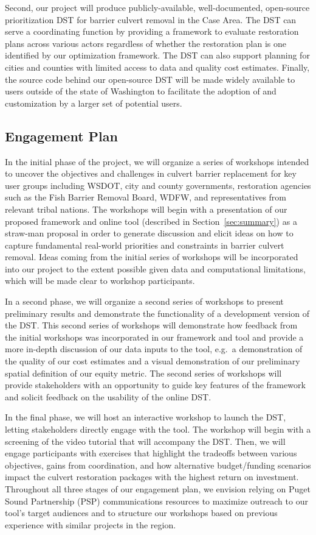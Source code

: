 \documentclass[12pt]{elsarticle}
\begin{document}
	
	Second, our project will produce publicly-available, well-documented, open-source prioritization DST for barrier culvert removal in the Case Area. The DST can serve a coordinating function by providing a framework to evaluate restoration plans across various actors regardless of whether the restoration plan is one identified by our optimization framework. The DST can also support planning for cities and counties with limited access to data and quality cost estimates. Finally, the source code behind our open-source DST will be made widely available to users outside of the state of Washington to facilitate the adoption of and customization by a larger set of potential users. 
	
	\subsection{Engagement Plan}\label{sec:engage}
	
	In the initial phase of the project, we will organize a series of workshops intended to uncover the objectives and challenges in culvert barrier replacement for key user groups including WSDOT, city and county governments, restoration agencies such as the Fish Barrier Removal Board, WDFW, and representatives from relevant tribal nations. The workshops will begin with a presentation of our proposed framework and online tool (described in Section~\ref{sec:summary}) as a straw-man proposal in order to generate discussion and elicit ideas on how to capture fundamental real-world priorities and constraints in barrier culvert removal. Ideas coming from the initial series of workshops will be incorporated into our project to the extent possible given data and computational limitations, which will be made clear to workshop participants.
	
	In a second phase, we will organize a second series of workshops to present preliminary results and demonstrate the functionality of a development version of the DST. This second series of workshops will demonstrate how feedback from the initial workshops was incorporated in our framework and tool and provide a more in-depth discussion of our data inputs to the tool, e.g.\ a demonstration of the quality of our cost estimates and a visual demonstration of our preliminary spatial definition of our equity metric. The second series of workshops will provide stakeholders with an opportunity to guide key features of the framework and solicit feedback on the usability of the online DST.
	
	In the final phase, we will host an interactive workshop to launch the DST, letting stakeholders directly engage with the tool. The workshop will begin with a screening of the video tutorial that will accompany the DST. Then, we will engage participants with exercises that highlight the tradeoffs between various objectives, gains from coordination, and how alternative budget/funding scenarios impact the culvert restoration packages with the highest return on investment. Throughout all three stages of our engagement plan, we envision relying on Puget Sound Partnership (PSP) communications resources to maximize outreach to our tool's target audiences and to structure our workshops based on previous experience with similar projects in the region. 
	
\end{document}
